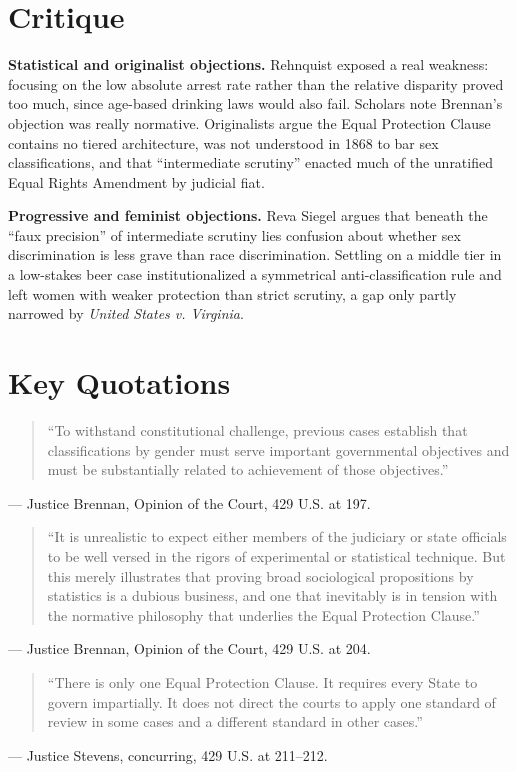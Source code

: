 \documentclass[12pt]{article}
\begin{document}
\section{Critique}

\textbf{Statistical and originalist objections.} Rehnquist exposed a real weakness: focusing on the low absolute arrest rate rather than the relative disparity proved too much, since age-based drinking laws would also fail. Scholars note Brennan's objection was really normative. Originalists argue the Equal Protection Clause contains no tiered architecture, was not understood in 1868 to bar sex classifications, and that ``intermediate scrutiny'' enacted much of the unratified Equal Rights Amendment by judicial fiat.

\textbf{Progressive and feminist objections.} Reva Siegel argues that beneath the ``faux precision'' of intermediate scrutiny lies confusion about whether sex discrimination is less grave than race discrimination. Settling on a middle tier in a low-stakes beer case institutionalized a symmetrical anti-classification rule and left women with weaker protection than strict scrutiny, a gap only partly narrowed by \textit{United States v. Virginia}.

\section{Key Quotations}

\begin{quote}
``To withstand constitutional challenge, previous cases establish that classifications by gender must serve important governmental objectives and must be substantially related to achievement of those objectives.''
\end{quote}
\noindent --- Justice Brennan, Opinion of the Court, 429 U.S. at 197.

\begin{quote}
``It is unrealistic to expect either members of the judiciary or state officials to be well versed in the rigors of experimental or statistical technique. But this merely illustrates that proving broad sociological propositions by statistics is a dubious business, and one that inevitably is in tension with the normative philosophy that underlies the Equal Protection Clause.''
\end{quote}
\noindent --- Justice Brennan, Opinion of the Court, 429 U.S. at 204.

\begin{quote}
``There is only one Equal Protection Clause. It requires every State to govern impartially. It does not direct the courts to apply one standard of review in some cases and a different standard in other cases.''
\end{quote}
\noindent --- Justice Stevens, concurring, 429 U.S. at 211--212.
\end{document}

